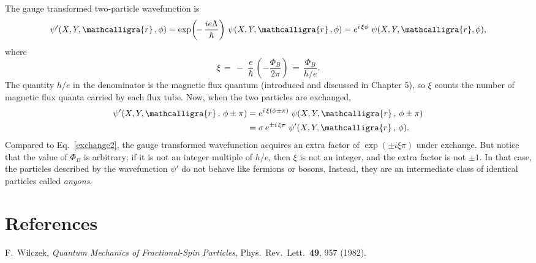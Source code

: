 \documentclass[prx,12pt]{revtex4-2}
\begin{document}
The gauge transformed two-particle wavefunction is
\begin{equation}
  \psi'(X, Y, \mathcalligra{r}\,, \phi)
  = \exp\!\left(\!-\,\frac{ie\Lambda}{\hbar}\right)\,
  \psi(X, Y, \mathcalligra{r}\,, \phi)
  = e^{i \, \xi \phi}\; \psi(X, Y, \mathcalligra{r}, \phi),
\end{equation}
where
\begin{equation}
  \xi \,=\, -\;\frac{e}{\hbar}\,\left(-\frac{\Phi_B}{2\pi}\right)
  \,=\, \frac{\Phi_B}{h/e}.
\end{equation}
The quantity $h/e$ in the denominator is the magnetic flux quantum
(introduced and discussed in Chapter 5), so $\xi$ counts the number of
magnetic flux quanta carried by each flux tube.  Now, when the two
particles are exchanged,
\begin{align}
  \psi'(X, Y, \mathcalligra{r}\,,\, \phi \pm \pi) &=
  e^{i \, \xi (\phi\pm \pi)} \;
  \psi(X, Y, \mathcalligra{r}\,,\, \phi \pm \pi) \\
  &= \sigma \,e^{\pm i \, \xi\pi}\;
  \psi'(X, Y, \mathcalligra{r}\,,\, \phi).
\end{align}
Compared to Eq.~\eqref{exchange2}, the gauge transformed wavefunction
acquires an extra factor of $\exp(\pm i \xi \pi)$ under exchange.  But
notice that the value of $\Phi_B$ is arbitrary; if it is not an
integer multiple of $h/e$, then $\xi$ is not an integer, and the extra
factor is not $\pm 1$.  In that case, the particles described by the
wavefunction $\psi'$ do not behave like fermions or bosons.  Instead,
they are an intermediate class of identical particles called
\textit{anyons}.

\section*{References}

\begin{enumerate}[[1{]}]
\item F.~Wilczek, \textit{Quantum Mechanics of Fractional-Spin Particles},
  Phys.~Rev.~Lett.~\textbf{49}, 957 (1982).
  \label{cite:wilczek}
\end{enumerate}
\end{document}
